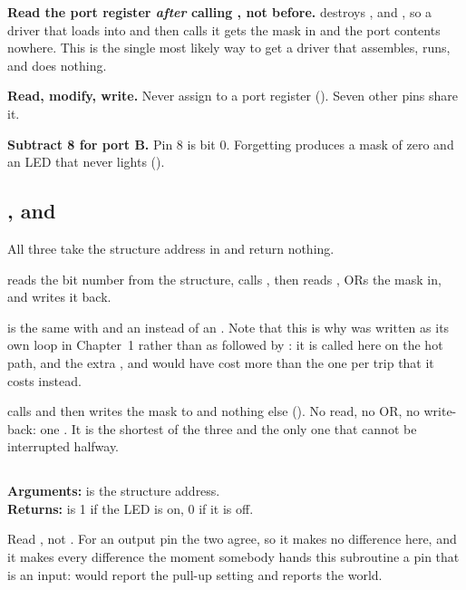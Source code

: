 \textbf{Read the port register \emph{after} calling , not before.}
 destroys ,  and , so a driver that loads
 into  and then calls it gets the mask in  and the port contents
nowhere. This is the single most likely way to get a driver that assembles, runs, and does
nothing.

\textbf{Read, modify, write.} Never assign to a port register (). Seven other
pins share it.

\textbf{Subtract 8 for port B.} Pin 8 is bit 0. Forgetting produces a mask of zero and an LED that
never lights ().

\subsection{,  and }
\label{c2:sec:onoff}
All three take the structure address in  and return nothing.

\textbf{} reads the bit number from the structure, calls , then reads
, ORs the mask in, and writes it back.

\textbf{} is the same with  and an  instead of an
. Note that this is why  was written as its own loop in
Chapter~1 rather than as  followed by : it is called here on the hot
path, and the extra ,  and  would have cost more than the one
 per trip that it costs instead.

\textbf{} calls  and then writes the mask to  and
nothing else (). No read, no OR, no write-back: one . It is the
shortest of the three and the only one that cannot be interrupted halfway.

\subsection{}
\label{c2:sec:enabled}
\noindent\textbf{Arguments:}  is the structure address.\\
\textbf{Returns:}  is 1 if the LED is on, 0 if it is off.

\medskip
Read , not . For an output pin the two agree, so it makes no difference
here, and it makes every difference the moment somebody hands this subroutine a pin that is an
input:  would report the pull-up setting and  reports the world.


